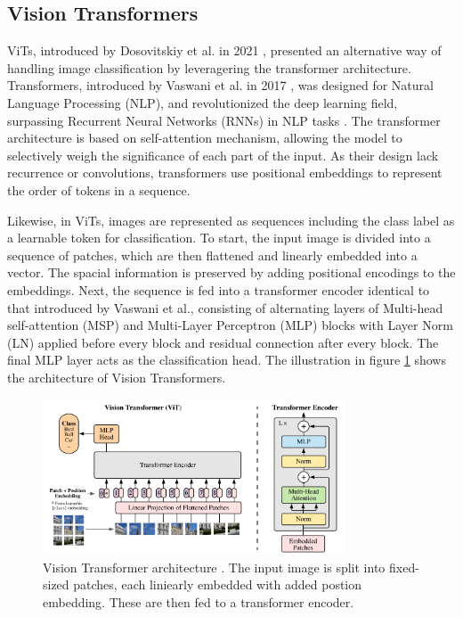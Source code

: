 
\subsection{Vision Transformers}
\label{sec:ViTs}
ViTs, introduced by Dosovitskiy et al. in 2021 \cite{dosovitskiy2021imageworth16x16words}, presented an alternative way of handling image classification by leveragering the transformer architecture. Transformers, introduced by Vaswani et al. in 2017 \cite{vaswani2023attentionneed}, was designed for Natural Language Processing (NLP), and revolutionized the deep learning field, surpassing Recurrent Neural Networks (RNNs) in NLP tasks \cite{v7labs-vit,vaswani2023attentionneed}. The transformer architecture is based on self-attention mechanism, allowing the model to selectively weigh the significance of each part of the input. As their design lack recurrence or convolutions, transformers use positional embeddings to represent the order of tokens in a sequence. 

Likewise, in ViTs, images are represented as sequences including the class label as a learnable token for classification. To start, the input image is divided into a sequence of patches, which are then flattened and linearly embedded into a vector. The spacial information is preserved by adding positional encodings to the embeddings. Next, the sequence is fed into a transformer encoder identical to that introduced by Vaswani et al., consisting of alternating layers of Multi-head self-attention (MSP) and Multi-Layer Perceptron (MLP) blocks with Layer Norm (LN) applied before every block and residual connection after every block. The final MLP layer acts as the classification head. The illustration in figure \ref{fig:vit_arch} shows the architecture of Vision Transformers.

\begin{figure}[h!]
    \centering
    \includegraphics[width=0.8\textwidth]{Images/vision_transformer.png} 
    \caption{Vision Transformer architecture \cite{dosovitskiy2021imageworth16x16words}. The input image is split into fixed-sized patches, each liniearly embedded with added postion embedding. These are then fed to a transformer encoder.}
    \label{fig:vit_arch}
\end{figure}

